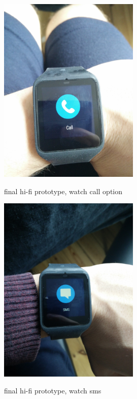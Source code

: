 \documentclass[runningheads,a4paper]{llncs}
\begin{document}
\begin{figure}
\centering
\caption{final hi-fi prototype, watch call option}
\includegraphics[width=0.6\textwidth]{figures/hi-fi-watch-call}
\label{fig:hi-fi watch call}
\end{figure}

\begin{figure}
\centering
\caption{final hi-fi prototype, watch sms}
\includegraphics[width=0.6\textwidth]{figures/hi-fi-watch-sms}
\label{fig:hi-fi watch sms}
\end{figure}
\end{document}
